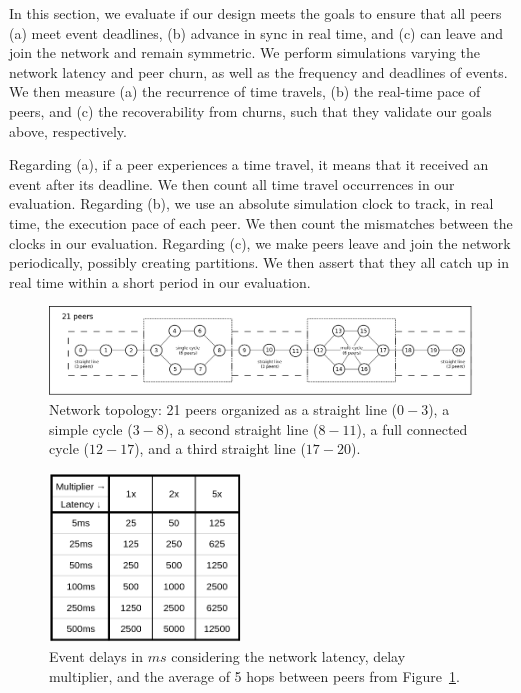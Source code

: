 \documentclass[fleqn,10pt]{SelfArx}
\begin{document}
In this section, we evaluate if our design meets the goals to ensure that all
peers
    (a) meet event deadlines,
    (b) advance in sync in real time, and
    (c) can leave and join the network and remain symmetric.
%
We perform simulations varying the network latency and peer churn, as well as
the frequency and deadlines of events.
%
We then measure
    (a) the recurrence of time travels,
    (b) the real-time pace of peers, and
    (c) the recoverability from churns,
such that they validate our goals above, respectively.

Regarding (a), if a peer experiences a time travel, it means that it received
an event after its deadline.
We then count all time travel occurrences in our evaluation.
%
Regarding (b), we use an absolute simulation clock to track, in real time, the
execution pace of each peer.
We then count the mismatches between the clocks in our evaluation.
%
Regarding (c), we make peers leave and join the network periodically, possibly
creating partitions.
We then assert that they all catch up in real time within a short period in our
evaluation.

\begin{figure}
  \centering
  \includegraphics[width=\linewidth]{topo}
  \caption{
    \label{fig.topo}
    Network topology: 21 peers organized as a straight line ($0-3$), a simple
    cycle ($3-8$), a second straight line ($8-11$), a full connected cycle
    ($12-17$), and a third straight line ($17-20$).
  }
\end{figure}

\begin{figure}
  \centering
  \includegraphics[width=2in]{mult}
  \caption{
    \label{fig.mult}
Event delays in $ms$ considering the network latency, delay multiplier, and the
average of 5 hops between peers from Figure~\ref{fig.topo}.
    }
\end{figure}
\end{document}
